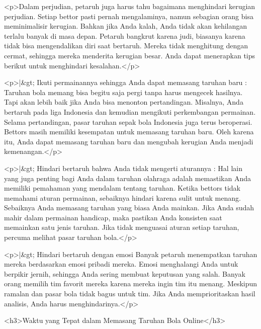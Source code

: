 {<p>Dalam perjudian, petaruh juga harus tahu bagaimana menghindari kerugian perjudian. Setiap bettor pasti pernah mengalaminya, namun sebagian orang bisa meminimalisir kerugian. Bahkan jika Anda kalah, Anda tidak akan kehilangan terlalu banyak di masa depan. Petaruh bangkrut karena judi, biasanya karena tidak bisa mengendalikan diri saat bertaruh. Mereka tidak menghitung dengan cermat, sehingga mereka menderita kerugian besar. Anda dapat menerapkan tips berikut untuk menghindari kesalahan.</p>



<p>|&gt; Ikuti permainannya sehingga Anda dapat memasang taruhan baru : Taruhan bola memang bisa begitu saja pergi tanpa harus mengecek hasilnya. Tapi akan lebih baik jika Anda bisa menonton pertandingan. Misalnya, Anda bertaruh pada liga Indonesia dan kemudian mengikuti perkembangan permainan. Selama pertandingan, pasar taruhan sepak bola Indonesia juga terus beroperasi. Bettors masih memiliki kesempatan untuk memasang taruhan baru. Oleh karena itu, Anda dapat memasang taruhan baru dan mengubah kerugian Anda menjadi kemenangan.</p>



<p>|&gt; Hindari bertaruh bahwa Anda tidak mengerti aturannya : Hal lain yang juga penting bagi Anda dalam taruhan olahraga adalah memastikan Anda memiliki pemahaman yang mendalam tentang taruhan. Ketika bettors tidak memahami aturan permainan, sebaiknya hindari karena sulit untuk menang. Sebaiknya Anda memasang taruhan yang biasa Anda mainkan. Jika Anda sudah mahir dalam permainan handicap, maka pastikan Anda konsisten saat memainkan satu jenis taruhan. Jika tidak menguasai aturan setiap taruhan, percuma melihat pasar taruhan bola.</p>



<p>|&gt; Hindari bertaruh dengan emosi Banyak petaruh menempatkan taruhan mereka berdasarkan emosi pribadi mereka. Emosi menghalangi Anda untuk berpikir jernih, sehingga Anda sering membuat keputusan yang salah. Banyak orang memilih tim favorit mereka karena mereka ingin tim itu menang. Meskipun ramalan dan pasar bola tidak bagus untuk tim. Jika Anda memprioritaskan hasil analisis, Anda harus menghindarinya.</p>



<h3>Waktu yang Tepat dalam Memasang Taruhan Bola Online</h3>



}
